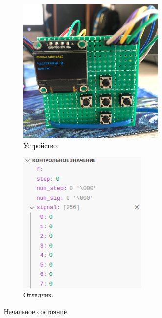	\begin{figure}[H]
     \begin{subfigure}[H]{0.5\textwidth}
         \centering
         \includegraphics[width=0.8\textwidth]{../image/test0_u_s.jpg}
         \caption{Устройство.}
     \end{subfigure}
     \hfill
     \begin{subfigure}[H]{0.5\textwidth}
         \centering
         \includegraphics[width=0.7\textwidth]{../image/test0_o_s.png}
         \caption{Отладчик.}
     \end{subfigure}
        \caption{Начальное состояние.}
	\end{figure}
	
